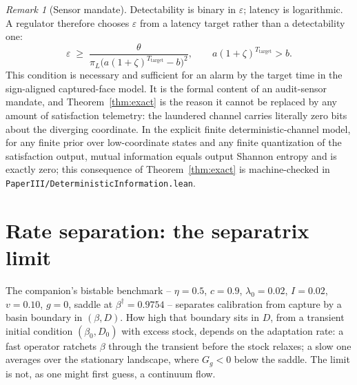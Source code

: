 \documentclass[11pt]{article}
\theoremstyle{definition}
\theoremstyle{remark}
\newtheorem{remark}[theorem]{Remark}
\numberwithin{equation}{section}
\begin{document}
\begin{remark}[Sensor mandate]\label{rem:sensor}
Detectability is binary in $\varepsilon$; latency is logarithmic. A regulator therefore chooses $\varepsilon$ from a latency target rather than a detectability one:
\[
\varepsilon \;\ge\;
\frac{\theta}{\pi_L\bigl(a(1+\zeta)^{T_{\mathrm{target}}}-b\bigr)^2},
\qquad a(1+\zeta)^{T_{\mathrm{target}}}>b.
\]
This condition is necessary and sufficient for an alarm by the target time in
the sign-aligned captured-face model. It is the formal content of an
audit-sensor mandate, and Theorem~\ref{thm:exact} is the reason it cannot be
replaced by any amount of satisfaction telemetry: the laundered channel
carries literally zero bits about the diverging coordinate. In the explicit
finite deterministic-channel model, for any finite prior over low-coordinate
states and any finite quantization of the satisfaction output, mutual
information equals output Shannon entropy and is exactly zero; this consequence
of Theorem~\ref{thm:exact} is machine-checked in
\texttt{PaperIII/DeterministicInformation.lean}.
\end{remark}

\section{Rate separation: the separatrix limit}\label{sec:rate}

The companion's bistable benchmark -- $\eta=0.5$, $c=0.9$, $\lambda_0=0.02$, $I=0.02$, $v=0.10$, $g=0$, saddle at $\beta^\dagger=0.9754$ -- separates calibration from capture by a basin boundary in $(\beta,D)$. How high that boundary sits in $D$, from a transient initial condition $(\beta_0,D_0)$ with excess stock, depends on the adaptation rate: a fast operator ratchets $\beta$ through the transient before the stock relaxes; a slow one averages over the stationary landscape, where $G_g<0$ below the saddle. The limit is not, as one might first guess, a continuum flow.
\end{document}
